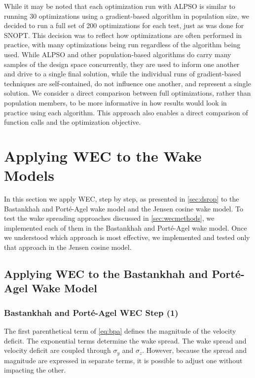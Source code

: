 \documentclass[a4paper]{jpconf}
\begin{document}
While it may be noted that each optimization run with ALPSO is similar to running 30 optimizations using a gradient-based algorithm in population size, we decided to run a full set of 200 optimizations for each test, just as was done for SNOPT. This decision was to reflect how optimizations are often performed in practice, with many optimizations being run regardless of the algorithm being used. While ALPSO and other population-based algorithms do carry many samples of the design space concurrently, they are used to inform one another and drive to a single final solution, while the individual runs of gradient-based techniques are self-contained, do not influence one another, and represent a single solution. We consider a direct comparison between full optimizations, rather than population members, to be more informative in how results would look in practice using each algorithm. This approach also enables a direct comparison of function calls and the optimization objective.



\section{Applying WEC to the  Wake Models}
In this section we apply WEC, step by step, as presented in \cref{sec:dsrop} to the Bastankhah and Port\'e-Agel wake model and the Jensen cosine wake model. To test the wake spreading approaches discussed in \cref{sec:wecmethods}, we implemented each of them in the Bastankhah and Port\'{e}-Agel wake model. Once we understood which approach is most effective, we implemented and tested only that approach in the Jensen cosine model.

\subsection{Applying WEC to the Bastankhah and Port\'e-Agel Wake Model}


\subsubsection{Bastankhah and Port\'e-Agel WEC Step (1)}
The first parenthetical term of \cref{eq:bpa} defines the magnitude of the velocity deficit. The exponential terms determine the wake spread. The wake spread and velocity deficit are coupled through $\sigma_y$ and $\sigma_z$. However, because the spread and magnitude are expressed in separate terms, it is possible to adjust one without impacting the other. 
\end{document}

